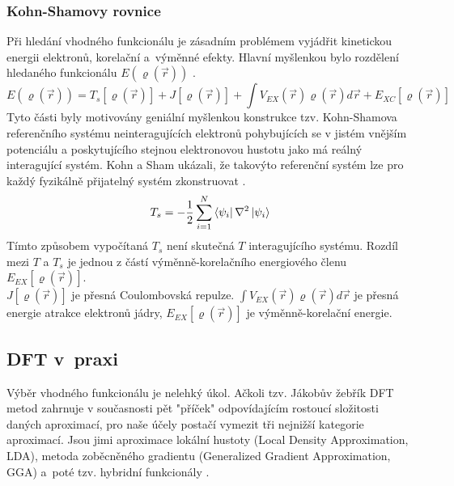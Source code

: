 \documentclass[
  printed, %
  table,   %
  lof,     %
  lot,     %
  oneside,
]{fithesis3}
\begin{document}
\subsubsection{Kohn-Shamovy rovnice}
Při hledání vhodného funkcionálu je zásadním problémem vyjádřit kinetickou energii elektronů, korelační a~výměnné efekty. Hlavní myšlenkou bylo rozdělení hledaného funkcionálu $E(\varrho(\vec{r}))$ \cite{koch2000chemist}.
\begin{equation}
E(\varrho(\vec{r})) = T_s[\varrho(\vec{r})] + J[\varrho(\vec{r})] + \int V_{EX}(\vec{r})\varrho(\vec{r})d\vec{r} + E_{XC}[\varrho(\vec{r})]
\end{equation}
 Tyto části byly motivovány geniální myšlenkou konstrukce tzv. Kohn-Shamova referenčního systému neinteragujících elektronů pohybujících se v jistém vnějším potenciálu a poskytujícího stejnou elektronovou hustotu jako má reálný interagující systém. Kohn a Sham ukázali, že takovýto referenční systém lze pro každý fyzikálně přijatelný systém zkonstruovat \cite{koch2000chemist}.
\begin{equation}
T_s = -\frac{1}{2} \sum_{i=1} ^{N}  \bra{\psi_i}{\nabla^{2}}\ket{\psi_i}
\label{kineticka_energie_jednoelektronova}
\end{equation}
Tímto způsobem vypočítaná $T_{s}$ není skutečná $T$ interagujícího systému. Rozdíl mezi $T$ a $T_s$ je jednou z částí výměnně-korelačního energiového členu $E_{EX}[\varrho(\vec{r})]$.   \\
$J[\varrho(\vec{r})]$ je přesná Coulombovská repulze. $\int V_{EX}(\vec{r})\varrho(\vec{r})d\vec{r}$ je přesná energie atrakce elektronů jádry, $E_{EX}[\varrho(\vec{r})]$ je výměnně-korelační energie.
\subsection{DFT v~praxi}
Výběr vhodného funkcionálu je nelehký úkol. Ačkoli tzv. Jákobův žebřík DFT metod zahrnuje v současnosti pět "příček" odpovídajícím rostoucí složitosti daných aproximací, pro naše účely postačí vymezit tři nejnižší kategorie aproximací. Jsou jimi aproximace lokální hustoty (Local Density Approximation, LDA), metoda zoběcněného gradientu (Generalized Gradient Approximation, GGA) a~poté tzv. hybridní funkcionály \cite{dftshrnutivysledky}.
\end{document}
